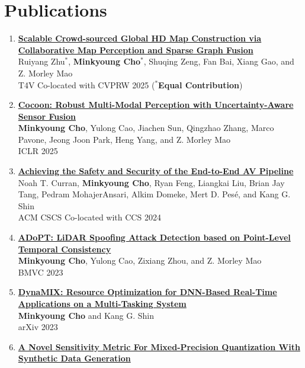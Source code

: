 \documentclass[letterpaper,oneside,11pt]{article}
\begin{document}
\section{Publications}
\begin{enumerate}[leftmargin=*, itemsep=0em]
  \item \small \textbf{\href{https://drive.google.com/file/d/1t422YHsrgB5f7Mz8uPgQbmgrrByOnTKx/view}{Scalable Crowd-sourced Global HD Map Construction via Collaborative Map Perception and Sparse Graph Fusion}} \\
  Ruiyang Zhu$^\ast$, \textbf{Minkyoung Cho$^\ast$}, Shuqing Zeng, Fan Bai, Xiang Gao, and Z. Morley Mao \\
  T4V Co-located with CVPRW 2025  ($^\ast$\textbf{Equal Contribution})
  \item \small \textbf{\href{https://openreview.net/pdf?id=DKgAFfCs5F}{Cocoon: Robust Multi-Modal Perception with
  Uncertainty-Aware Sensor Fusion}} \\
  \textbf{Minkyoung Cho}, Yulong Cao, Jiachen Sun, Qingzhao Zhang, Marco Pavone, Jeong Joon Park, Heng Yang, and Z. Morley Mao\\ 
  ICLR 2025
  \item \small \textbf{\href{https://dl.acm.org/doi/abs/10.1145/3689936.3694694}{Achieving the Safety and Security of the End-to-End AV Pipeline}}\\
  Noah T. Curran, \textbf{Minkyoung Cho}, Ryan Feng, Liangkai Liu, Brian Jay Tang, Pedram MohajerAnsari, Alkim Domeke, Mert D. Pesé, and Kang G. Shin\\
  ACM CSCS Co-located with CCS 2024 
  \item \small \textbf{\href{https://arxiv.org/abs/2310.14504}{ADoPT: LiDAR Spoofing Attack Detection based on Point-Level Temporal Consistency}}\\
  \textbf{Minkyoung Cho}, Yulong Cao, Zixiang Zhou, and Z. Morley Mao\\
  BMVC 2023
  \item \small  \textbf{\href{https://arxiv.org/abs/2302.01568}{DynaMIX: Resource Optimization for DNN-Based Real-Time Applications on a Multi-Tasking System}}\\
  \textbf{Minkyoung Cho} and Kang G. Shin\\
  arXiv 2023
  \item \small \textbf{\href{https://ieeexplore.ieee.org/abstract/document/9506527}{A Novel Sensitivity Metric For Mixed-Precision Quantization With Synthetic Data Generation}}\\

\end{enumerate}
\end{document}
